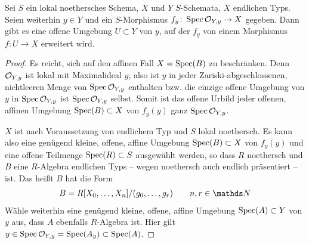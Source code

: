 \begin{Lemma}\label{thm:morphismuserweiterung}
  Sei $S$ ein lokal noethersches Schema,
  $X$ und $Y$ $S$-Schemata,
  $X$ endlichen Typs.
  Seien weiterhin $y\in Y$ und 
  ein $S$-Morphismus $f_y\colon \operatorname{Spec}\mathcal{O}_{Y,y}\to X$ gegeben.
  Dann gibt es eine offene Umgebung $U\subset Y$ von $y$, auf der
  $f_y$ von einem Morphismus $f\colon U\to X$ erweitert wird.
  \begin{proof}
    Es reicht, sich auf den affinen Fall $X=\operatorname{Spec}(B)$ zu beschränken.
    Denn $\mathcal{O}_{Y,y}$ ist lokal mit Maximalideal $y$, also ist $y$ in
    jeder Zariski-abgeschlossenen, nichtleeren Menge von $\operatorname{Spec}\mathcal{O}_{Y,y}$
    enthalten bzw. die einzige offene Umgebung von $y$ in
    $\operatorname{Spec}\mathcal{O}_{Y,y}$ ist $\operatorname{Spec}\mathcal{O}_{Y,y}$ selbst.
    Somit ist das offene Urbild jeder offenen, affinen Umgebung
    $\operatorname{Spec}(B)\subset X$ von $f_y(y)$ ganz $\operatorname{Spec}\mathcal{O}_{Y,y}$.

    $X$ ist nach Voraussetzung von endlichem Typ und $S$ lokal
    noethersch.
    Es kann also eine genügend kleine, offene, affine Umgebung
    $\operatorname{Spec}(B)\subset X$ von $f_y(y)$ und eine offene Teilmenge
    $\operatorname{Spec}(R)\subset S$ ausgewählt werden,
    so dass $R$ noethersch und $B$ eine $R$-Algebra endlichen Typs
    – wegen noethersch auch endlich präsentiert – ist. Das heißt $B$
    hat die Form
    \begin{gather*}
      B=R[X_0,\dotsc, X_n]/(g_0,\dotsc, g_r)\qquad n,r\in\N
    \end{gather*}
    Wähle weiterhin eine genügend kleine, offene, affine Umgebung
    $\operatorname{Spec}(A)\subset Y$ von $y$ aus, dass $A$ ebenfalls $R$-Algebra ist.
    Hier gilt $y\in\operatorname{Spec}\mathcal{O}_{Y,y}=\operatorname{Spec}(A_y)\subset\operatorname{Spec}(A)$.
    

\end{proof}
\end{Lemma}
